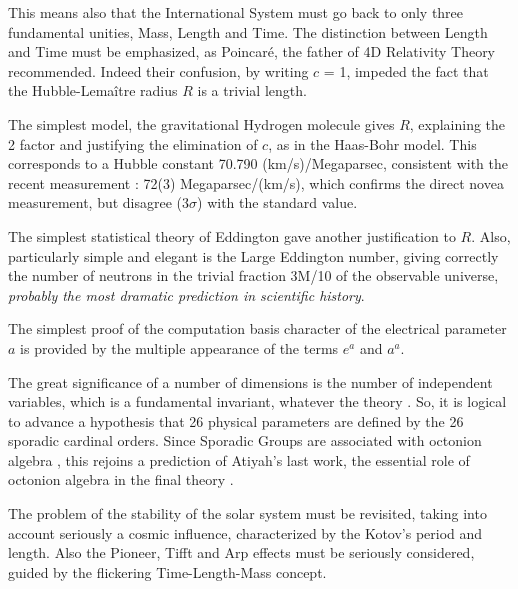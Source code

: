 \documentclass[twoside,draft]{article}
\begin{document}
\begin{sloppypar}
This means also that the International System must go back to only three fundamental unities,
Mass, Length and Time. The distinction between Length and Time must be emphasized, as
Poincar\'{e}, the father of 4D Relativity Theory recommended. Indeed their confusion, by writing $c$ =
1, impeded the fact that the Hubble-Lema\^{i}tre radius $R$ is a trivial length.

The simplest model, the gravitational Hydrogen molecule gives $R$, explaining the 2 factor and
justifying the elimination of $c$, as in the Haas-Bohr model. This corresponds to a Hubble constant 70.790
(km/s)/Megaparsec, consistent with the recent measurement \cite{Bonvin}: 72(3) Megaparsec/(km/s), which
confirms the direct novea measurement, but disagree (3$\sigma$) with the standard value.

The simplest statistical theory of Eddington gave another justification to $R$. Also, particularly
simple and elegant is the Large Eddington number, giving correctly the number of neutrons in the
trivial fraction 3M/10 of the observable universe, \textit{probably the most dramatic prediction in
 scientific history}.

The simplest proof of the computation basis character of the electrical parameter $a$ is provided
by the multiple appearance of the terms $e^{a}$ and $a^{a}$.

The great significance of a number of dimensions is the number of independent variables,
which is a fundamental invariant, whatever the theory \cite{Weigel}. So, it is logical to advance a
hypothesis that 26 physical parameters are defined by the 26 sporadic cardinal orders. Since
Sporadic Groups are associated with octonion algebra \cite{Atiyah2}, this rejoins a prediction of Atiyah's last
work, the essential role of octonion algebra in the final theory \cite{Koide}.

The problem of the stability of the solar system must be revisited, taking into account
seriously a cosmic influence, characterized by the Kotov's period and length. Also the Pioneer, Tifft
and Arp effects must be seriously considered, guided by the flickering Time-Length-Mass concept.


\end{sloppypar}
\end{document}
